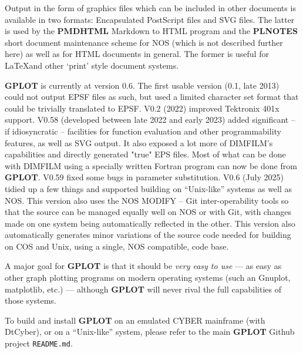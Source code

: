 \documentclass[a4paper,twoside,11pt]{article}
\newcommand{\newpara}{\par\vspace{4mm}\noindent}
\begin{document}
\newpara
Output in the form of graphics files which  can be included in other documents is available in two formats:
Encapsulated PostScript files and SVG files. The latter is 
used by the \textbf{PMDHTML} Markdown to HTML program and the \textbf{PLNOTES} short document maintenance scheme for NOS
(which is not described further here) as well as for HTML documents in general. The former is useful for \LaTeX and other
`print' style document systems.
\newpara
\textbf{GPLOT} is currently at version 0.6. The first usable version (0.1, late 2013) 
could not output EPSF files as such, but used a
limited character set format that could be trivially translated to EPSF. V0.2 (2022) improved Tektronix 401x support. V0.58
(developed between late 2022 and early 2023) added significant -- if idiosyncratic -- facilities for function evaluation 
and other programmability features, as well as SVG output. It also exposed a lot more of DIMFILM's capabilities and directly
generated "true" EPS files. Most of what can be done with DIMFILM using a specially
written Fortran program can now be done from \textbf{GPLOT}. V0.59 fixed some bugs in parameter substitution. V0.6 (July 2025)
tidied up a few things and supported building on ``Unix-like'' systems as well as NOS. This version also uses the NOS MODIFY --
Git inter-operability tools so that the source can be managed equally well on NOS or with Git, with changes made on one system
being automatically reflected in the other. This version also automatically generates minor variations of the source code
needed for building on COS and Unix, using a single, NOS compatible, code base.
\newpara
A major goal for \textbf{GPLOT} is that it should be \textit{very easy to use} --- as easy as other graph plotting
programs on modern operating systems (such an Gnuplot, matplotlib, etc.) --- although \textbf{GPLOT} will never rival
the full capabilities of those systems.
\newpara
To build and install \textbf{GPLOT} on an emulated CYBER mainframe (with DtCyber), or on a ``Unix-like'' system,
please refer to the main \textbf{GPLOT} Github project \texttt{README.md}.
\end{document}
